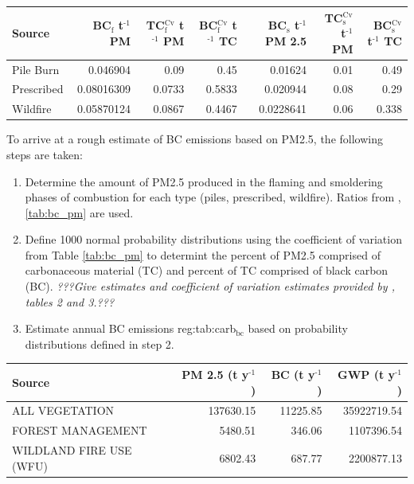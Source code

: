 \documentclass[a4paper]{article}
\begin{document}
\begin{center}
\begin{tabular}{lrrrrrr}
Source & BC$_{\text{f}}$ t$^{\text{-1}}$ PM & TC$_{\text{f}}^{\text{Cv}}$ t$^{\text{-1}}$ PM & BC$_{\text{f}}^{\text{Cv}}$ t$^{\text{-1}}$ TC & BC$_{\text{s}}$ t$^{\text{-1}}$ PM 2.5 & TC$_{\text{s}}^{\text{Cv}}$ t$^{\text{-1}}$ PM & BC$_{\text{s}}^{\text{Cv}}$ t$^{\text{-1}}$ TC\\
\hline
Pile Burn & 0.046904 & 0.09 & 0.45 & 0.01624 & 0.01 & 0.49\\
Prescribed & 0.08016309 & 0.0733 & 0.5833 & 0.020944 & 0.08 & 0.29\\
Wildfire & 0.05870124 & 0.0867 & 0.4467 & 0.0228641 & 0.06 & 0.338\\
\end{tabular}
\end{center}



To arrive at a rough estimate of BC emissions based on PM2.5, the
following steps are taken:

\begin{enumerate}
\item Determine the amount of PM2.5 produced in the flaming and smoldering
phases of combustion for each type (piles, prescribed,
wildfire). Ratios from \citet{Ward1989}, \ref{tab:bc_pm} are used.

\item Define 1000 normal probability distributions using the coefficient
of variation from Table \ref{tab:bc_pm} to determint the percent of PM2.5
comprised of carbonaceous material (TC) and percent of TC comprised
of black carbon (BC). \emph{\emph{???Give estimates and coefficient of variation
estimates provided by \citet{Ward1989}, tables 2 and 3.???}}

\item Estimate annual BC emissions reg:tab:carb$_{\text{bc}}$ based on probability distributions
defined in step 2.
\end{enumerate}


\begin{center}
\begin{tabular}{lrrr}
Source & PM 2.5 (t y$^{\text{-1}}$) & BC (t y$^{\text{-1}}$) & GWP (t y$^{\text{-1}}$)\\
\hline
ALL VEGETATION & 137630.15 & 11225.85 & 35922719.54\\
FOREST MANAGEMENT & 5480.51 & 346.06 & 1107396.54\\
WILDLAND FIRE USE (WFU) & 6802.43 & 687.77 & 2200877.13\\
\end{tabular}
\end{center}
\end{document}
